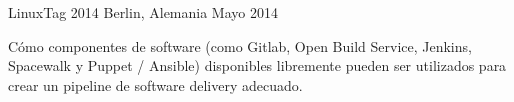 \begin{cventries}
    {LinuxTag 2014} %
    {Berlin, Alemania} %
    {Mayo 2014} %
    {
      \begin{cvitems} %
      \item {Cómo componentes de software (como Gitlab, Open Build Service, Jenkins, Spacewalk y Puppet / Ansible) disponibles libremente pueden ser utilizados para crear un pipeline de software delivery adecuado.}
      \end{cvitems}
    }

\end{cventries}

